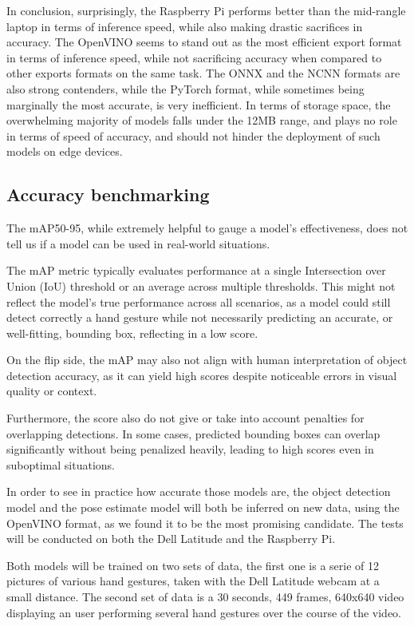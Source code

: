 \documentclass[12pt]{article}
\begin{document}
In conclusion, surprisingly, the Raspberry Pi performs better than the mid-rangle laptop in terms of inference speed, while also making drastic sacrifices in accuracy. The OpenVINO seems to stand out as the most efficient export format in terms of inference speed, while not sacrificing accuracy when compared to other exports formats on the same task. The ONNX and the NCNN formats are also strong contenders, while the PyTorch format, while sometimes being marginally the most accurate, is very inefficient. In terms of storage space, the overwhelming majority of models falls under the 12MB range, and plays no role in terms of speed of accuracy, and should not hinder the deployment of such models on edge devices.

\subsection{Accuracy benchmarking}

The mAP50-95, while extremely helpful to gauge a model's effectiveness, does not tell us if a model can be used in real-world situations.

The mAP metric typically evaluates performance at a single Intersection over Union (IoU) threshold or an average across multiple thresholds. This might not reflect the model's true performance across all scenarios, as a model could still detect correctly a hand gesture while not necessarily predicting an accurate, or well-fitting, bounding box, reflecting in a low score.

On the flip side, the mAP may also not align with human interpretation of object detection accuracy, as it can yield high scores despite noticeable errors in visual quality or context.

Furthermore, the score also do not give or take into account penalties for overlapping detections. In some cases, predicted bounding boxes can overlap significantly without being penalized heavily, leading to high scores even in suboptimal situations.

In order to see in practice how accurate those models are, the object detection model and the pose estimate model will both be inferred on new data, using the OpenVINO format, as we found it to be the most promising candidate. The tests will be conducted on both the Dell Latitude and the Raspberry Pi.

Both models will be trained on two sets of data, the first one is a serie of 12 pictures of various hand gestures, taken with the Dell Latitude webcam at a small distance. The second set of data is a 30 seconds, 449 frames, 640x640 video displaying an user performing several hand gestures over the course of the video.
\end{document}
